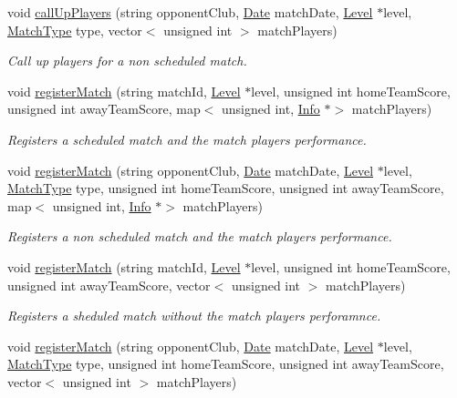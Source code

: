 \begin{DoxyCompactItemize}
void \hyperlink{class_club_ae330b70a246969ed36e76aedcc77fa0a}{call\+Up\+Players} (string opponent\+Club, \hyperlink{class_date}{Date} match\+Date, \hyperlink{class_level}{Level} $\ast$level, \hyperlink{_utils_8hpp_a747637046be33d7273262104aad8069d}{Match\+Type} type, vector$<$ unsigned int $>$ match\+Players)
\begin{DoxyCompactList}\small\item\em Call up players for a non scheduled match. \end{DoxyCompactList}\item 
void \hyperlink{class_club_a92bf3c683dc8fbb4ef73672d8a241e40}{register\+Match} (string match\+Id, \hyperlink{class_level}{Level} $\ast$level, unsigned int home\+Team\+Score, unsigned int away\+Team\+Score, map$<$ unsigned int, \hyperlink{class_info}{Info} $\ast$$>$ match\+Players)
\begin{DoxyCompactList}\small\item\em Registers a scheduled match and the match players performance. \end{DoxyCompactList}\item 
void \hyperlink{class_club_a64291b5f72e6864a9982195411bdb705}{register\+Match} (string opponent\+Club, \hyperlink{class_date}{Date} match\+Date, \hyperlink{class_level}{Level} $\ast$level, \hyperlink{_utils_8hpp_a747637046be33d7273262104aad8069d}{Match\+Type} type, unsigned int home\+Team\+Score, unsigned int away\+Team\+Score, map$<$ unsigned int, \hyperlink{class_info}{Info} $\ast$$>$ match\+Players)
\begin{DoxyCompactList}\small\item\em Registers a non scheduled match and the match players performance. \end{DoxyCompactList}\item 
void \hyperlink{class_club_a65e4343bba040f67bf27576eb68a7921}{register\+Match} (string match\+Id, \hyperlink{class_level}{Level} $\ast$level, unsigned int home\+Team\+Score, unsigned int away\+Team\+Score, vector$<$ unsigned int $>$ match\+Players)
\begin{DoxyCompactList}\small\item\em Registers a sheduled match without the match players perforamnce. \end{DoxyCompactList}\item 
void \hyperlink{class_club_a5bb1f9f0f9f3cbef1f77330482b7b297}{register\+Match} (string opponent\+Club, \hyperlink{class_date}{Date} match\+Date, \hyperlink{class_level}{Level} $\ast$level, \hyperlink{_utils_8hpp_a747637046be33d7273262104aad8069d}{Match\+Type} type, unsigned int home\+Team\+Score, unsigned int away\+Team\+Score, vector$<$ unsigned int $>$ match\+Players)

\end{DoxyCompactItemize}
